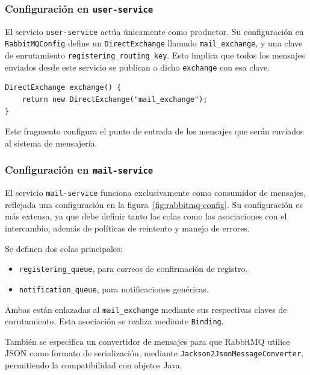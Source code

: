 \subsubsection{Configuración en \texttt{user-service}}

El servicio \texttt{user-service} actúa únicamente como productor. Su configuración en \texttt{RabbitMQConfig} define un \texttt{DirectExchange} llamado \texttt{mail\_exchange}, y una clave de enrutamiento \texttt{registering\_routing\_key}. Esto implica que todos los mensajes enviados desde este servicio se publican a dicho \texttt{exchange} con esa clave.

\begin{verbatim}
DirectExchange exchange() {
    return new DirectExchange("mail_exchange");
}
\end{verbatim}

Este fragmento configura el punto de entrada de los mensajes que serán enviados al sistema de mensajería.

\subsubsection{Configuración en \texttt{mail-service}}

El servicio \texttt{mail-service} funciona exclusivamente como consumidor de mensajes, reflejada una configuración en la figura~\ref{fig:rabbitmq-config}. Su configuración es más extensa, ya que debe definir tanto las colas como las asociaciones con el intercambio, además de políticas de reintento y manejo de errores.

Se definen dos colas principales:
\begin{itemize}
  \item \texttt{registering\_queue}, para correos de confirmación de registro.
  \item \texttt{notification\_queue}, para notificaciones genéricas.
\end{itemize}

Ambas están enlazadas al \texttt{mail\_exchange} mediante sus respectivas claves de enrutamiento. Esta asociación se realiza mediante \texttt{Binding}.

También se especifica un convertidor de mensajes para que RabbitMQ utilice JSON como formato de serialización, mediante \texttt{Jackson2JsonMessageConverter}, permitiendo la compatibilidad con objetos Java.

